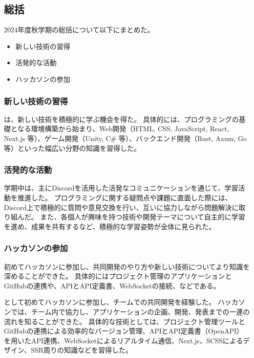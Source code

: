 \subsection*{\firstGrade{}総括}


2024年度秋学期の\firstGrade{}総括について以下にまとめた。

\begin{itemize}
	\item 新しい技術の習得
	\item 活発的な活動
	\item ハッカソンの参加
\end{itemize}

\subsubsection*{新しい技術の習得}

\firstGrade{}は、新しい技術を積極的に学ぶ機会を得た。
具体的には、プログラミングの基礎となる環境構築から始まり、Web開発（HTML, CSS, JavaScript, React, Next.js 等）、ゲーム開発（Unity, C# 等）、バックエンド開発（Rust, Axum, Go 等）といった幅広い分野の知識を習得した。

\subsubsection*{活発的な活動}

学期中は、主にDiscordを活用した活発なコミュニケーションを通じて、学習活動を推進した。
プログラミングに関する疑問点や課題に直面した際には、Discord上で積極的に質問や意見交換を行い、互いに協力しながら問題解決に取り組んだ。
また、各個人が興味を持つ技術や開発テーマについて自主的に学習を進め、成果を共有するなど、積極的な学習姿勢が全体に見られた。

\subsubsection*{ハッカソンの参加}
初めてハッカソンに参加し、共同開発のやり方や新しい技術についてより知識を深めることができた。
具体的にはプロジェクト管理のアプリケーションとGitHubの連携や、APIとAPI定義書、WebSocketの接続、などである。

\firstGrade{}として初めてハッカソンに参加し、チームでの共同開発を経験した。
ハッカソンでは、チーム内で協力し、アプリケーションの企画、開発、発表までの一連の流れを知ることができた。
具体的な技術としては、プロジェクト管理ツールとGitHubの連携による効率的なバージョン管理、APIとAPI定義書（OpenAPI）を用いたAPI連携、WebSocketによるリアルタイム通信、Next.js、SCSSによるデザイン、SSR周りの知識などを習得した。
